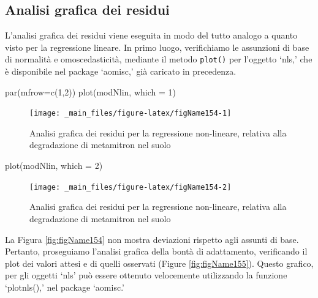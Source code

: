 \documentclass[a4paper,12pt,oneside]{book}
\newenvironment{Shaded}{\begin{snugshade}}{\end{snugshade}}
\newcommand{\DecValTok}[1]{#1}
\newcommand{\FunctionTok}[1]{#1}
\newcommand{\AttributeTok}[1]{#1}
\newcommand{\NormalTok}[1]{#1}
\begin{document}
\hypertarget{analisi-grafica-dei-residui-1}{%
\subsection{Analisi grafica dei residui}\label{analisi-grafica-dei-residui-1}}

L'analisi grafica dei residui viene eseguita in modo del tutto analogo a quanto visto per la regressione lineare. In primo luogo, verifichiamo le assunzioni di base di normalità e omoscedasticità, mediante il metodo \texttt{plot()} per l'oggetto `nls,' che è disponibile nel package `aomisc,' già caricato in precedenza.

\begin{Shaded}
\begin{Highlighting}[]
\FunctionTok{par}\NormalTok{(}\AttributeTok{mfrow=}\FunctionTok{c}\NormalTok{(}\DecValTok{1}\NormalTok{,}\DecValTok{2}\NormalTok{))}
\FunctionTok{plot}\NormalTok{(modNlin, }\AttributeTok{which =} \DecValTok{1}\NormalTok{)}
\end{Highlighting}
\end{Shaded}

\begin{figure}

{\centering \texttt{[image: \_main\_files/figure-latex/figName154-1]} 

}

\caption{Analisi grafica dei residui per la regressione non-lineare, relativa alla degradazione di metamitron nel suolo}\label{fig:figName154-1}
\end{figure}

\begin{Shaded}
\begin{Highlighting}[]
\FunctionTok{plot}\NormalTok{(modNlin, }\AttributeTok{which =} \DecValTok{2}\NormalTok{)}
\end{Highlighting}
\end{Shaded}

\begin{figure}

{\centering \texttt{[image: \_main\_files/figure-latex/figName154-2]} 

}

\caption{Analisi grafica dei residui per la regressione non-lineare, relativa alla degradazione di metamitron nel suolo}\label{fig:figName154-2}
\end{figure}

La Figura \ref{fig:figName154} non mostra deviazioni rispetto agli assunti di base. Pertanto, proseguiamo l'analisi grafica della bontà di adattamento, verificando il plot dei valori attesi e di quelli osservati (Figure \ref{fig:figName155}). Questo grafico, per gli oggetti `nls' può essere ottenuto velocemente utilizzando la funzione `plotnls(),' nel package `aomisc.'
\end{document}
